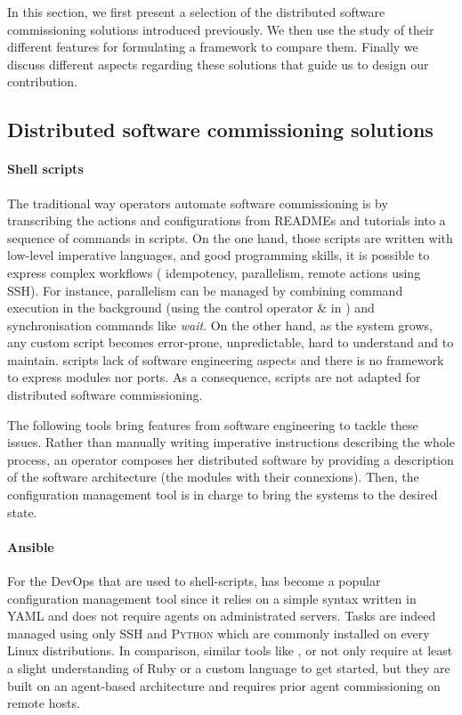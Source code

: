 
In this section, we first present a selection of the distributed software
commissioning solutions introduced previously. We then use the study of their
different features for formulating a framework to compare them.  Finally we
discuss different aspects regarding these solutions that guide us to design our
contribution.


\subsection{Distributed software commissioning solutions}

\paragraph{Shell scripts}
The traditional way operators automate software commissioning is by transcribing
the actions and configurations from READMEs and tutorials into a sequence of
commands in \shell scripts.
On the one hand, those scripts are written with low-level imperative languages,
and good programming skills, it is possible to express complex workflows (\eg
idempotency, parallelism, remote actions using \textsc{SSH}).
For instance, parallelism can be managed by combining command execution in the
background (\eg using the control operator \& in \bash) and synchronisation
commands like \emph{wait}.
On the other hand, as the system grows, any custom script becomes error-prone,
unpredictable, hard to understand and to maintain.
\shell scripts lack of software engineering aspects and there is no framework to
express modules nor ports. As a consequence, \shell scripts are not adapted for
distributed software commissioning.

The following tools bring features from software engineering to tackle these
issues. Rather than manually writing imperative instructions describing the
whole process, an operator composes her distributed software by providing a
description of the software architecture (\ie the modules with their
connexions). Then, the configuration management tool is in charge to bring the
systems to the desired state.

\paragraph{Ansible}
For the DevOps that are used to shell-scripts, \ansible has become a popular
configuration management tool since it relies on a simple syntax written in YAML
and does not require agents on administrated servers. Tasks are indeed managed
using only \textsc{SSH} and \textsc{Python} which are commonly installed on
every Linux distributions.
In comparison, similar tools like \chef, \puppet or \cfengine not only require
at least a slight understanding of Ruby or a custom language to get started, but
they are built on an agent-based architecture and requires prior agent
commissioning on remote hosts.

